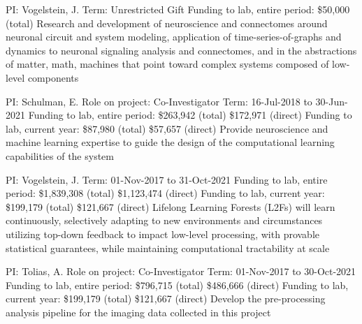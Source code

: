 \documentclass[10pt,colorlinks=true,urlcolor=blue]{moderncv}
\begin{document}
    {\newline PI: Vogelstein, J.
    \newline Term: Unrestricted Gift
    \newline Funding to lab, entire period: \$50,000 (total)
    \newline Research and development of neuroscience and connectomes around neuronal circuit and
    system modeling, application of time-series-of-graphs and dynamics to neuronal signaling
    analysis and connectomes, and in the abstractions of matter, math, machines that point
    toward complex systems composed of low-level components}{}{}{}{}
    
    {\newline PI: Schulman, E.
    \newline Role on project: Co-Investigator
    \newline Term: 16-Jul-2018 to 30-Jun-2021
    \newline Funding to lab, entire period: \$263,942 (total) \$172,971 (direct)
    \newline Funding to lab, current year: \$87,980 (total) \$57,657 (direct)
    \newline Provide neuroscience and machine learning expertise to guide the design of the
    computational learning capabilities of the system}{}{}{}
    
    {\newline PI: Vogelstein, J.
    \newline Term: 01-Nov-2017 to 31-Oct-2021
    \newline Funding to lab, entire period: \$1,839,308 (total) \$1,123,474 (direct)
    \newline Funding to lab, current year: \$199,179 (total) \$121,667 (direct)
    \newline Lifelong Learning Forests (L2Fs) will learn continuously, selectively adapting to new
    environments and circumstances utilizing top-down feedback to impact low-level
    processing, with provable statistical guarantees, while maintaining computational tractability
    at scale}{}{}{}{}
    
    {\newline PI: Tolias, A.
    \newline Role on project: Co-Investigator
    \newline Term: 01-Nov-2017 to 30-Oct-2021
    \newline Funding to lab, entire period: \$796,715 (total) \$486,666 (direct)
    \newline Funding to lab, current year: \$199,179 (total) \$121,667 (direct)
    \newline Develop the pre-processing analysis pipeline for the imaging data collected in this project}{}{}{}
    
\end{document}
